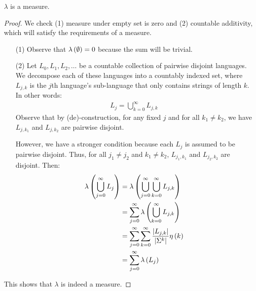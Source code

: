 \begin{theorem}
  \(\lambda\) is a measure.
\end{theorem}
\begin{proof}
  We check (1) measure under empty set is zero and (2) countable additivity,
  which will satisfy the requirements of a measure.
  \begin{enumerate}
    \item[(1)]
      Observe that \(\lambda\left(\emptyset\right) = 0\) because the sum
      will be trivial.

    \item[(2)]
      Let \(L_0, L_1, L_2, \ldots\) be a countable collection of pairwise
      disjoint languages.
      We decompose each of these languages into a countably indexed set,
      where \(L_{j, k}\) is the \(j\)th language's sub-language
      that only contains strings of length \(k\).
      In other words:
      \begin{align*}
        L_j = \bigcup_{k = 0}^{\infty} L_{j, k}
      \end{align*}
      Observe that by (de)-construction, for any fixed \(j\) and for all
      \(k_1 \neq k_2\), we have \(L_{j, k_1}\) and \(L_{j, k_2}\) are
      pairwise disjoint.

      However, we have a stronger condition because each \(L_j\) is
      assumed to be pairwise disjoint.
      Thus, for all \(j_1 \neq j_2\) and \(k_1 \neq k_2\),
      \(L_{j_1, k_1}\) and \(L_{j_2, k_2}\) are disjoint.
      Then:
      \begin{align*}
        \lambda\left(\bigcup_{j = 0}^{\infty} L_j\right)
          &= \lambda\left(\bigcup_{j = 0}^{\infty}
                            \bigcup_{k = 0}^{\infty} L_{j, k}\right) \\
          &= \sum_{j = 0}^{\infty}
              \lambda\left(\bigcup_{k = 0}^{\infty} L_{j, k}\right) \\
          &= \sum_{j = 0}^{\infty}
              \sum_{k = 0}^{\infty}
              \frac{\left\lvert L_{j, k}\right\rvert}{\left\lvert\Sigma^k\right\rvert}
                \eta\left(k\right) \\
          &= \sum_{j = 0}^{\infty} \lambda\left(L_j\right)
      \end{align*}
  \end{enumerate}
  This shows that \(\lambda\) is indeed a measure.
\end{proof}



